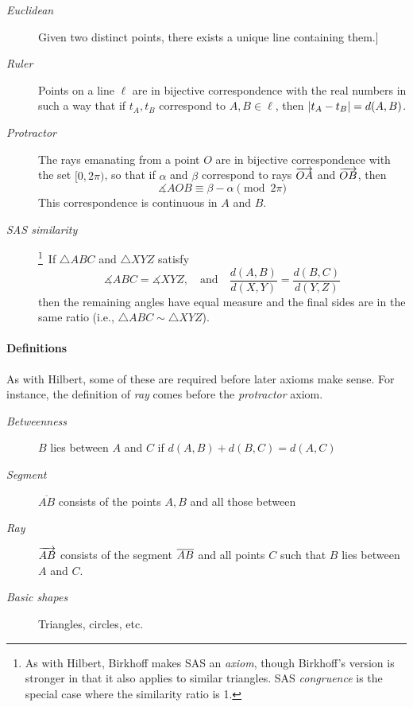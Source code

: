 \begin{description}
	\item[\normalfont\emph{Euclidean}] Given two distinct points, there exists a unique line containing them.]
	
  \item[\normalfont\emph{Ruler}] Points on a line $\ell$ are in bijective correspondence with the real numbers in such a way that if $t_A,t_B$ correspond to $A,B\in\ell$, then $\left| t_A-t_B\right|=d(A,B)$.
  
  \item[\normalfont\emph{Protractor}] The rays emanating from a point $O$ are in bijective correspondence with the set $[0,2\pi)$, so that if $\alpha$ and $\beta$ correspond to rays $\overrightarrow{OA}$ and $\overrightarrow{OB}$, then
  \[
  	\measuredangle AOB\equiv \beta-\alpha\pmod{2\pi}
  \]
  This correspondence is continuous in $A$ and $B$.
  
  \item[\normalfont\emph{SAS similarity}]\!\!\footnote{%
		As with Hilbert, Birkhoff makes SAS an \emph{axiom}, though Birkhoff's version is stronger in that it also applies to similar triangles. SAS \emph{congruence} is the special case where the similarity ratio is 1.%
	}\, If $\triangle ABC$ and $\triangle XYZ$ satisfy
	\[
		\measuredangle ABC=\measuredangle XYZ,\quad\text{and}\quad
		\frac{d(A,B)}{d(X,Y)}=\frac{d(B,C)}{d(Y,Z)}
	\]
	then the remaining angles have equal measure and the final sides are in the same ratio (i.e., $\triangle ABC\sim\triangle XYZ$).
\end{description}

\paragraph{Definitions}

As with Hilbert, some of these are required before later axioms make sense. For instance, the definition of \emph{ray} comes before the \emph{protractor} axiom.
\begin{description}
	\item[\normalfont\emph{Betweenness}] $B$ lies between $A$ and $C$ if $d(A,B)+d(B,C)=d(A,C)$
  \item[\normalfont\emph{Segment}] $\overline{AB}$ consists of the points $A,B$ and all those between
  \item[\normalfont\emph{Ray}] $\overrightarrow{AB}$ consists of the segment $\overline{AB}$ and all points $C$ such that $B$ lies between $A$ and $C$.
  \item[\normalfont\emph{Basic shapes}] Triangles, circles, etc.
\end{description}




